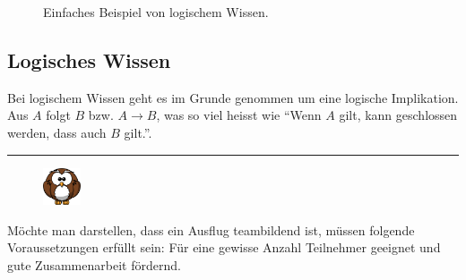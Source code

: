 \begin{figure}[htbp]
\centering {}
\caption{Einfaches Beispiel von logischem Wissen.\label{fig:experten_systeme_prozedurales_wissen}\protect\footnotemark}
\end{figure}

\newpage

\subsection{Logisches Wissen}
\label{subsec:logisches_wissen}

Bei logischem Wissen geht es im Grunde genommen um eine logische Implikation. Aus $A$ folgt $B$ bzw. $A \to B$, was so viel heisst wie ``Wenn $A$ gilt, kann geschlossen werden, dass auch $B$ gilt.''.

\noindent\rule[1ex]{\textwidth}{1pt}
\begin{figure}
    \vspace{-14pt}
    \includegraphics[width=0.1\textwidth]{bilder/owl.png}
\end{figure}
Möchte man darstellen, dass ein Ausflug teambildend ist, müssen folgende Voraussetzungen erfüllt sein: Für eine gewisse Anzahl Teilnehmer geeignet und gute Zusammenarbeit fördernd.


